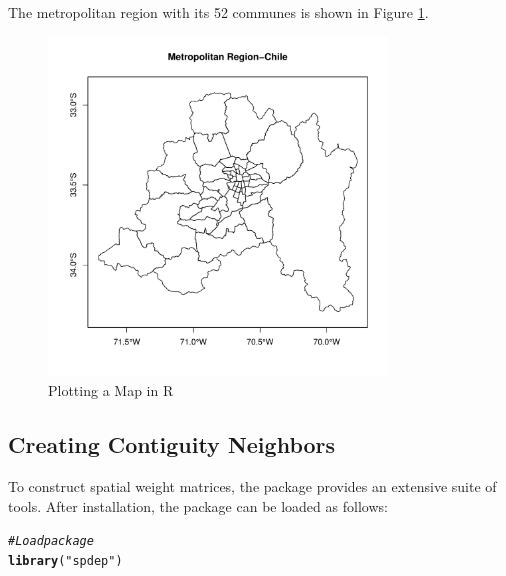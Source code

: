 \documentclass[english,12pt]{book}\usepackage[]{graphicx}\usepackage[]{xcolor}
\makeatletter
\newcommand{\hlstr}[1]{\textcolor[rgb]{0.192,0.494,0.8}{#1}}%
\newcommand{\hlcom}[1]{\textcolor[rgb]{0.678,0.584,0.686}{\textit{#1}}}%
\newcommand{\hlstd}[1]{\textcolor[rgb]{0.345,0.345,0.345}{#1}}%
\newcommand{\hlkwd}[1]{\textcolor[rgb]{0.737,0.353,0.396}{\textbf{#1}}}%
\newenvironment{kframe}{%
 \def\at@end@of@kframe{}%
 \ifinner\ifhmode%
  \def\at@end@of@kframe{\end{minipage}}%
  \begin{minipage}{\columnwidth}%
 \fi\fi%
 \def\FrameCommand##1{\hskip\@totalleftmargin \hskip-\fboxsep
 \colorbox{shadecolor}{##1}\hskip-\fboxsep
     \hskip-\linewidth \hskip-\@totalleftmargin \hskip\columnwidth}%
 \MakeFramed {\advance\hsize-\width
   \@totalleftmargin\z@ \linewidth\hsize
   \@setminipage}}%
 {\par\unskip\endMakeFramed%
 \at@end@of@kframe}
\newenvironment{knitrout}{}{} %
\makeatother
\begin{document}
The metropolitan region with its 52 communes is shown in Figure \ref{fig:plot_mr}.

\begin{figure}[h]
  \caption{Plotting a Map in R}
    \label{fig:plot_mr}
\begin{knitrout}
\color{fgcolor}

{\centering \includegraphics[width=9cm,height=9cm]{figure/plot_mr-1} 

}


\end{knitrout}
\end{figure}

\subsection{Creating Contiguity Neighbors}\label{sec:computing-W-in-R}

To construct spatial weight matrices, the  package \citep{bivand2013computing} provides an extensive suite of tools. After installation, the package can be loaded as follows:

\begin{knitrout}
\color{fgcolor}\begin{kframe}
\begin{alltt}
\hlcom{#Load package}
\hlkwd{library}\hlstd{(}\hlstr{"spdep"}\hlstd{)}
\end{alltt}
\end{kframe}
\end{knitrout}
\end{document}
